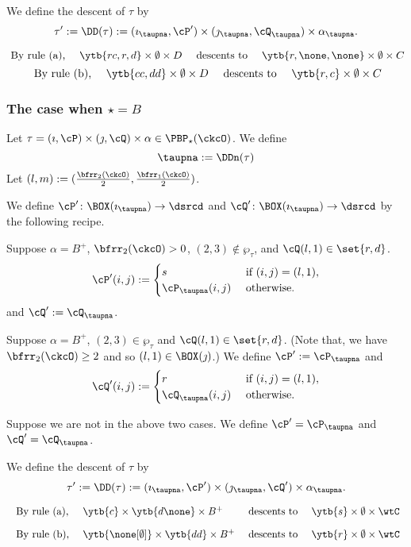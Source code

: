 \documentclass[ssunip]{subfiles}
\begin{document}
{We define  the descent of $\tau$ by 
\[
    \tau' :=\DD(\tau):= (\imath_\taupna,\cP')\times (\jmath_\taupna, \cQ_\taupna)\times \alpha_\taupna.
\]

\begin{Example}
 \[
 \text{ By rule (a),  }\quad
 \ytb{rc,r,d}\times \emptyset\times D \quad\text{ descents to }\quad
 \ytb{r, \none,\none} \times \emptyset \times C
 \]
 \[
 \text{ By rule (b),  }\quad
 \ytb{cc,dd}\times \emptyset\times D\quad \text{ descents to }\quad
 \ytb{r, c} \times \emptyset \times C
 \]
\end{Example}

\subsubsection{The case when $\star=B$}

Let $\tau = (\imath,\cP)\times (\jmath,\cQ)\times \alpha \in \PBP_\star(\ckcO)$. 
We define 
\[
    \taupna:= \DDn(\tau) 
\]
Let $(l,m) := (\frac{\bfrr_2(\ckcO)}{2},\frac{\bfrr_1(\ckcO)}{2})$.

We define $\cP'\colon \BOX(\imath_\taupna) \rightarrow \dsrcd$  and 
$\cQ'\colon \BOX(\imath_\taupna) \rightarrow \dsrcd$ by the following recipe.  

\begin{enumC}
\item
Suppose $\alpha = B^+$, $\bfrr_2(\ckcO)>0$, $(2,3)\notin \wp_\tau$, and $\cQ(l,1)\in \set{r,d}$. 
\[
\cP'(i,j) := \begin{cases}
  s & \text{ if } (i,j) = (l,1),\\
  \cP_\taupna(i,j) & \text{ otherwise}.
\end{cases}
\]
and $\cQ':= \cQ_\taupna$.
\item
Suppose $\alpha=B^+$, $(2,3) \in \wp_\tau$ and $\cQ(l,1) \in  \set{r,d}$. 
(Note that, we  have $\bfrr_2(\ckcO)\geq 2$ and so $(l,1)\in \BOX(\jmath)$.)
We define
$\cP' := \cP_\taupna$ and 
\[
\cQ'(i,j) := \begin{cases}
  r & \text{ if } (i,j) = (l,1),\\
  \cQ_\taupna(i,j) & \text{ otherwise}.
\end{cases}
\]
\item Suppose we are not in the above two cases.
We define $\cP' = \cP_\taupna$ and $\cQ' = \cQ_\taupna$.
\end{enumC}

We define  the descent of $\tau$ by 
\[
    \tau' :=\DD(\tau):= (\imath_\taupna,\cP')\times (\jmath_\taupna, \cQ')\times \alpha_\taupna.
\]

 
\begin{Example}
 \[
 \begin{array}{llcl}
 \text{ By rule (a),  } & 
 \ytb{c}\times \ytb{d\none}\times B^+  & \text{ descents to } &
 \ytb{s} \times \emptyset \times \wtC\\[1em]
  \text{ By rule (b),  } & \ytb{{\none[\emptyset]}} \times \ytb{dd}\times 
  B^+ &  \text{ descents to } &
 \ytb{r} \times \emptyset \times \wtC
 \end{array}
 \]

\end{Example}
}
% 
\end{document}
